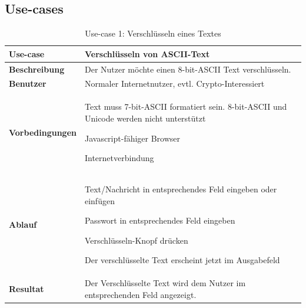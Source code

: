 \documentclass[11pt,paper=a4,final]{scrartcl}
\begin{document}
\subsection{Use-cases}
\begin{table}[h!]
  \centering
  \begin{tabular}{|l|p{12cm}|}\hline
    \bf Use-case & \bf Verschl\"usseln von ASCII-Text \\ \hline
    \bf Beschreibung & Der Nutzer m\"ochte einen 8-bit-ASCII Text
    verschl\"usseln. \\ \hline
    \bf Benutzer & Normaler Internetnutzer, evtl. Crypto-Interessiert \\ \hline
    \bf Vorbedingungen & \begin{itemize*} \item Text muss 7-bit-ASCII formatiert
    sein. 8-bit-ASCII und Unicode werden nicht unterst\"utzt \item
    Javascript-f\"ahiger Browser \item Internetverbindung \end{itemize*} \\
    \hline
    \bf Ablauf & \begin{itemize*} \item Text/Nachricht in entsprechendes Feld eingeben
    oder einf\"ugen \item Passwort in entsprechendes Feld eingeben \item
    Verschl\"usseln-Knopf dr\"ucken \item Der verschl\"usselte Text erscheint
    jetzt im Ausgabefeld \end{itemize*} \\ \hline
    \bf Resultat & Der Verschl\"usselte Text wird dem Nutzer im entsprechenden
    Feld angezeigt. \\ \hline
  \end{tabular}
  \caption{Use-case 1: Verschl\"usseln eines Textes}
  \label{tab:usecase1}
\end{table}
\end{document}
